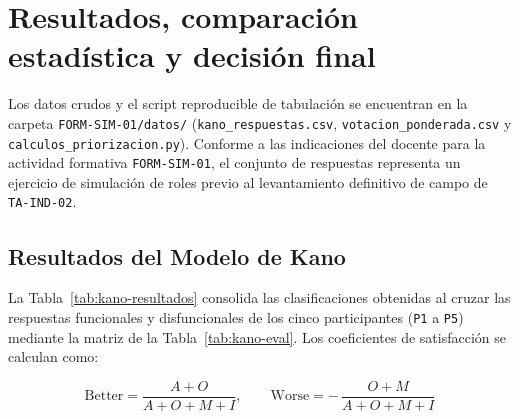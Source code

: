 \section{Resultados, comparaci\'on estad\'istica y decisi\'on final}
\label{sec:resultados}

Los datos crudos y el script reproducible de tabulaci\'on se encuentran en la carpeta \texttt{FORM-SIM-01/datos/} (\texttt{kano\_respuestas.csv}, \texttt{votacion\_ponderada.csv} y \texttt{calculos\_priorizacion.py}). Conforme a las indicaciones del docente para la actividad formativa \texttt{FORM-SIM-01}, el conjunto de respuestas representa un ejercicio de simulaci\'on de roles previo al levantamiento definitivo de campo de \texttt{TA-IND-02}.

\subsection{Resultados del Modelo de Kano}

La Tabla~\ref{tab:kano-resultados} consolida las clasificaciones obtenidas al cruzar las respuestas funcionales y disfuncionales de los cinco participantes (\texttt{P1} a \texttt{P5}) mediante la matriz de la Tabla~\ref{tab:kano-eval}. Los coeficientes de satisfacci\'on se calculan como:

\begin{equation}
\text{Better} = \frac{A + O}{A + O + M + I}, \qquad \text{Worse} = -\,\frac{O + M}{A + O + M + I}
\end{equation}

